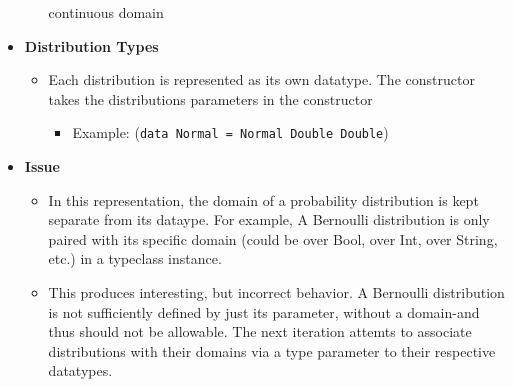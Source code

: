 \documentclass[11pt]{article}
\begin{document}
\begin{itemize}
\begin{itemize}
continuous domain
\end{itemize}
\item \textbf{Distribution Types}
\begin{itemize}
\item Each distribution is represented as its own datatype. The constructor
takes the distributions parameters in the constructor
\begin{itemize}
\item Example: (\texttt{data Normal = Normal Double Double})
\end{itemize}
\end{itemize}
\item \textbf{Issue}
\begin{itemize}
\item In this representation, the domain of a probability distribution
is kept separate from its dataype. For example, A Bernoulli
distribution is only paired with its specific domain (could be
over Bool, over Int, over String, etc.) in a typeclass instance.
\item This produces interesting, but incorrect behavior. A Bernoulli
distribution is not sufficiently defined by just its parameter,
without a domain-and thus should not be allowable. The next
iteration attemts to associate distributions with their domains
via a type parameter to their respective datatypes.
\end{itemize}
\end{itemize}
\end{document}
